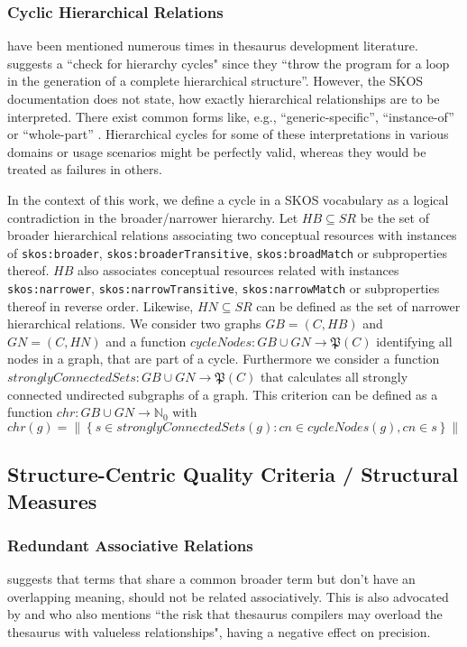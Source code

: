 \documentclass{llncs}
\begin{document}
\subsubsection{Cyclic Hierarchical Relations} have been mentioned numerous times in thesaurus development literature. \cite{Soergel2002} suggests a ``check for hierarchy cycles" since they ``throw the program for a loop in the generation of a complete hierarchical structure”. However, the SKOS documentation does not state, how exactly hierarchical relationships are to be interpreted. There exist common forms like, e.g., “generic-specific”, “instance-of” or “whole-part” \cite{Hedden2010,Harpring2010,Aitchison2000}. Hierarchical cycles for some of these interpretations in various domains or usage scenarios might be perfectly valid, whereas they would be treated as failures in others.

\begin{definition}
In the context of this work, we define a cycle in a SKOS vocabulary as a logical contradiction in the broader/narrower hierarchy. Let \(HB \subseteq SR\) be the set of broader hierarchical relations associating two conceptual resources with instances of \texttt{skos:broader}, \texttt{skos:broaderTransitive}, \texttt{skos:broadMatch} or subproperties thereof. \(HB\) also associates conceptual resources related with instances \texttt{skos:narrower}, \texttt{skos:narrowTransitive}, \texttt{skos:narrowMatch} or subproperties thereof in reverse order. Likewise, \(HN \subseteq SR\) can be defined as the set of narrower hierarchical relations. We consider two graphs \(GB = (C,HB)\) and \(GN=(C,HN)\) and a function \(cycleNodes:GB \cup GN \rightarrow \mathfrak{P}(C)\) identifying all nodes in a graph, that are part of a cycle. Furthermore we consider a function \(stronglyConnectedSets: GB \cup GN \rightarrow \mathfrak{P}(C)\) that calculates all strongly connected undirected subgraphs of a graph. This criterion can be defined as a function \(chr:GB \cup GN \rightarrow \mathbb{N}_{0}\) with \[chr(g)=\left\|\left\{s \in stronglyConnectedSets(g) : cn \in cycleNodes(g), cn \in s\right\}\right\|\]
\end{definition}

\subsection{Structure-Centric Quality Criteria / Structural Measures}

\subsubsection{Redundant Associative Relations} \cite{ISO25964-1:2011} suggests that terms that share a common broader term but don’t have an overlapping meaning, should not be related associatively. This is also advocated by \cite{Hedden2010} and \cite{Aitchison2000} who also mentions ``the risk that thesaurus compilers may overload the thesaurus with valueless relationships", having a negative effect on precision.
\end{document}
